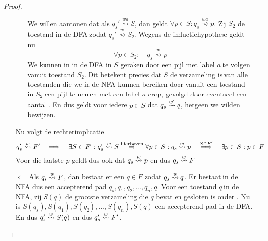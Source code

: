 \documentclass[../aanvullingen_cursus.tex]{subfiles}
\begin{document}
\begin{proof}
\begin{enumerate}
\begin{itemize}
			We willen aantonen dat als \(q_{s}' \overset{wa}{\rightsquigarrow} S\), dan geldt \(\forall p \in S: q_s \overset{wa}{\rightsquigarrow} p\). Zij \(S_2\) de toestand in de DFA zodat \(q_{s}' \overset{w}{\rightsquigarrow} S_2\). Wegens de inductiehypothese geldt nu \[ \forall p\in S_2: \quad q_s \overset{w}{\rightsquigarrow} p\]We kunnen in in de DFA in \(S\) geraken door een pijl met label \(a\) te volgen vanuit toestand \(S_2\). Dit betekent precies dat \(S\) de verzameling is van alle toestanden die we in de NFA kunnen bereiken door vanuit een toestand in \(S_2\) een pijl te nemen met een label \(a\) erop, gevolgd door eventueel een aantal \epsilonbogen. En dus geldt voor iedere \(p \in S\) dat \(q_s \overset{w'}{\rightsquigarrow} q \), hetgeen we wilden bewijzen.
		\end{itemize}

		Nu volgt de rechterimplicatie \[q_s'\overset{w}{\rightsquigarrow}F' \quad \Longrightarrow \quad \exists S \in F': q_s' \overset{w}{\rightsquigarrow} S \overset{\text{hierboven}}{\Rightarrow} \forall p \in S: q_s \overset{w}{\rightsquigarrow} p \quad \overset{S \in F'}{\Longrightarrow} \quad \exists p \in S : p \in F\] Voor die laatste \(p\) geldt dus ook dat \(q_s \overset{w}{\rightsquigarrow} p\) en dus \(q_s \overset{w}{\rightsquigarrow} F\)

		\item[\(\Leftarrow\)] Als \(q_s \overset{w}{\rightsquigarrow} F\), dan bestaat er een \(q \in F\) zodat \(q_s \overset{w}{\rightsquigarrow} q\). Er bestaat in de NFA dus een accepterend pad \(q_s, q_1, q_2, ..., q_n, q\). Voor een toestand \( q \) in de NFA, zij \(S(q)\) de grootste verzameling die \(q\) bevat en gesloten is onder \epsilonbogen. Nu is \(S(q_s), S(q_1), S(q_2), ..., S(q_n), S(q)\) een accepterend pad in de DFA. En dus \(q_{s}' \overset{w}{\rightsquigarrow} S(q)\) en dus \(q_{s}' \overset{w}{\rightsquigarrow} F'\).
	\end{enumerate}

\end{proof}
\end{document}
